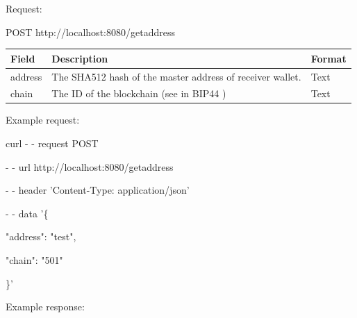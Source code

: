 Request:

\begin{framed}
    POST http://localhost:8080/getaddress
\end{framed}

\begin{tabular}{m{3cm}  m{9cm} m{2.6cm}}
    \toprule
    Field & Description & Format                                            \\ 
    \midrule
    address & The SHA512 hash of the master address of receiver wallet. & Text   \\ 
    chain   & The ID of the blockchain (see in BIP44 \cite{bip44}) & Text    \\ 
    \bottomrule
\end{tabular}
\bigskip

Example request:

\begin{framed}
\hspace*{13mm}    curl - - request POST \par
\hspace*{13mm}        - - url http://localhost:8080/getaddress \par
\hspace*{13mm}        - - header 'Content-Type: application/json' \par
\hspace*{13mm}        - - data '\{ \par
\hspace*{20mm}                "address": "test", \par
\hspace*{20mm}                "chain": "501" \par
\hspace*{20mm}            \}' \par
\end{framed}


Example response:

